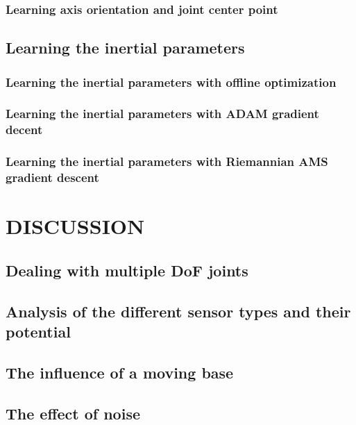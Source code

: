 \documentclass{article}
\begin{document}
\subsubsection{Learning axis orientation and joint center point }
\subsection{Learning the inertial parameters}
\subsubsection{Learning the inertial parameters with offline optimization}
\subsubsection{Learning the inertial parameters with ADAM gradient decent}
\subsubsection{Learning the inertial parameters with Riemannian AMS gradient descent}

\section{DISCUSSION}
\subsection{Dealing with multiple DoF joints}
\subsection{Analysis of the different sensor types and their potential}
\subsection{The influence of a moving base}
\subsection{The effect of noise}
\end{document}
